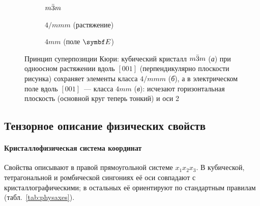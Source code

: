 \begin{figure}[ht]
\centering
{}
\begin{subfigure}[b]{0.32\textwidth}\centering
{}
\caption{$m\bar{3}m$}
\end{subfigure}\hfill
\begin{subfigure}[b]{0.32\textwidth}\centering
{}
\caption{$4/mmm$ (растяжение)}
\end{subfigure}\hfill
\begin{subfigure}[b]{0.32\textwidth}\centering
{}
\caption{$4mm$ (поле $\vb E$)}
\end{subfigure}
\caption{Принцип суперпозиции Кюри: кубический кристалл $m\bar{3}m$
(\textit{а}) при одноосном растяжении вдоль $[001]$ (перпендикулярно
плоскости рисунка) сохраняет элементы класса $4/mmm$ (\textit{б}), а в
электрическом поле вдоль $[001]$~— класса $4mm$ (\textit{в}): исчезают
горизонтальная плоскость (основной круг теперь тонкий) и оси 2}
\label{fig:curie-principle}
\end{figure}

\subsection{Тензорное описание физических свойств}\label{ssec:tensors}

\paragraph{Кристаллофизическая система координат}
Свойства описывают в правой прямоугольной системе $x_1x_2x_3$. В
кубической, тетрагональной и ромбической сингониях её оси совпадают с
кристаллографическими; в остальных её ориентируют по стандартным
правилам (табл.~\ref{tab:physaxes}).

